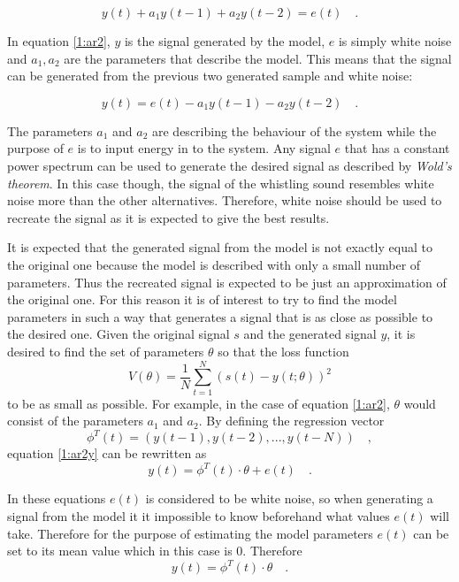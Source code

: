 \documentclass{IEEEtran}
\begin{document}
\begin{equation}
  \label{1:ar2}
  y(t) + a_1 y(t-1) + a_2 y(t-2) = e(t) \quad .
\end{equation}

In equation \ref{1:ar2}, $y$ is the signal generated by the model, $e$ is
simply white noise and $a_1, a_2$ are the parameters that describe the
model. This means that the signal can be generated from the previous two
generated sample and white noise:

\begin{equation}
  \label{1:ar2y}
  y(t) = e(t) - a_1 y(t-1) - a_2 y(t-2)\quad .
\end{equation}

The parameters $a_1$ and $a_2$ are describing the behaviour of the system
while the purpose of $e$ is to input energy in to the system. Any signal
$e$ that has a constant power spectrum can be used to generate the desired
signal as described by \textit{Wold's theorem}\cite{signalproc}. In this
case though, the signal of the whistling sound resembles white noise more
than the other alternatives. Therefore, white noise should be used to
recreate the signal as it is expected to give the best results.

It is expected that the generated signal from the model is not exactly
equal to the original one because the model is described with only a small
number of parameters. Thus the recreated signal is expected to be just an
approximation of the original one. For this reason it is of interest to
try to find the model parameters in such a way that generates a signal
that is as close as possible to the desired one. Given the original signal
$s$ and the generated signal $y$, it is desired to find the set of
parameters $\theta$ so that the loss function
\begin{equation}
  \label{1:loss}
  V(\theta)  = \frac{1}{N}\sum_{t=1}^{N}(s(t) - y(t; \theta))^2
\end{equation}
to be as small as possible. For example, in the case of equation \ref{1:ar2},
$\theta$ would consist of the parameters $a_1$ and $a_2$. By defining
the regression vector
\begin{equation}
  \phi^T(t) = (y(t-1), y(t-2), ... , y(t-N)) \quad ,
\end{equation}
equation \ref{1:ar2y} can be rewritten as
\begin{equation}
  y(t) = \phi^T(t)\cdot\theta + e(t) \quad .
\end{equation}

In these equations $e(t)$ is considered to be white noise, so when
generating a signal from the model it it impossible to know beforehand
what values $e(t)$ will take. Therefore for the purpose of estimating
the model parameters $e(t)$ can be set to its mean value which in this
case is $0$. Therefore
\begin{equation}
  \label{1:esty}
  y(t) = \phi^T(t)\cdot\theta \quad .
\end{equation}
\end{document}
